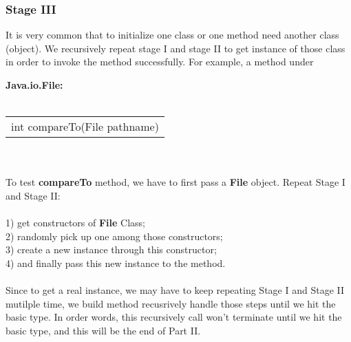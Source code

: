 \documentclass{article}
\begin{document}
\subsubsection{Stage III}
It is very common that to initialize one class or one method need 
another class (object). We recursively repeat stage I and stage II to get 
instance of those class in order to invoke the method successfully. 
For example, a method under 
{\bf \small \ttfamily Java.io.File:\\ \\
\begin{tabular}{l}
int compareTo(File pathname)
\end{tabular}
}\\ \\
To test {\bf\small\ttfamily compareTo} method, we have to first 
pass a {\bf \small \ttfamily File} object. Repeat Stage I and Stage II:\\ \\
1) get constructors of {\bf \small \ttfamily File} Class; \\
2) randomly pick up one among those constructors; \\
3) create a new instance through this constructor;\\
4) and finally pass this new instance to the method. \\ \\
Since to get a real 
instance, we may have to keep repeating Stage I and Stage II mutilple time, we 
build method recusrively handle those steps until we hit the basic type. 
In order 
words, this recursively call won't terminate until we hit the basic type, 
and this will be the end of Part II. \\
\end{document}
